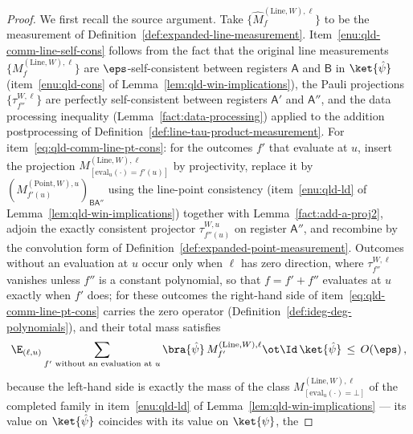 \begin{proof}
	\leanok
	We first recall the source argument.
	Take $\{\hat{M}^{(\mathrm{Line},W),\ell}_f\}$ to be the measurement of
	Definition~\ref{def:expanded-line-measurement}.
	Item~\ref{enu:qld-comm-line-self-cons} follows from the fact that the
	original line measurements $\{M^{(\mathrm{Line},W),\ell}_f\}$ are
	$\eps$-self-consistent between registers $\mathsf{A}$ and $\mathsf{B}$
	in $\ket{\hat{\psi}}$ (item~\ref{enu:qld-cons} of
	Lemma~\ref{lem:qld-win-implications}), the Pauli projections
	$\{\tau^{W,\ell}_{f''}\}$ are perfectly self-consistent between
	registers $\mathsf{A}'$ and $\mathsf{A}''$, and the data processing
	inequality (Lemma~\ref{fact:data-processing}) applied to the addition
	postprocessing of Definition~\ref{def:line-tau-product-measurement}. For
	item~\ref{eq:qld-comm-line-pt-cons}: for the outcomes $f'$ that
	evaluate at $u$, insert the projection
	$M^{(\mathrm{Line},W),\ell}_{[\mathrm{eval}_u(\cdot)=f'(u)]}$ by
	projectivity, replace it by
	$(M^{(\mathrm{Point},W),u}_{f'(u)})_{\mathsf{B}\mathsf{A}''}$ using the
	line-point consistency (item~\ref{enu:qld-ld} of
	Lemma~\ref{lem:qld-win-implications}) together with
	Lemma~\ref{fact:add-a-proj2}, adjoin the exactly consistent projector
	$\tau^{W,u}_{f''(u)}$ on register $\mathsf{A}''$, and recombine by the
	convolution form of Definition~\ref{def:expanded-point-measurement}.
	Outcomes without an evaluation at $u$ occur only when $\ell$ has zero
	direction, where $\tau^{W,\ell}_{f''}$ vanishes unless $f''$ is a
	constant polynomial, so that $f = f' + f''$ evaluates at $u$ exactly
	when $f'$ does; for these outcomes the right-hand side of
	item~\ref{eq:qld-comm-line-pt-cons} carries the zero operator
	(Definition~\ref{def:ideg-deg-polynomials}), and their total mass
	satisfies
	\[
		\E_{(\ell,u)} \sum_{f' \text{ without an evaluation at } u}
		\bra{\hat{\psi}}\, M^{(\mathrm{Line},W),\ell}_{f'} \ot \Id\,
		\ket{\hat{\psi}} \,\leq\, O(\eps)\,,
	\]
	because the left-hand side is exactly the mass of the class
	$M^{(\mathrm{Line},W),\ell}_{[\mathrm{eval}_u(\cdot)=\bot]}$ of the
	completed family in item~\ref{enu:qld-ld} of
	Lemma~\ref{lem:qld-win-implications} --- its value on
	$\ket{\hat{\psi}}$ coincides with its value on $\ket{\psi}$, the

\end{proof}
